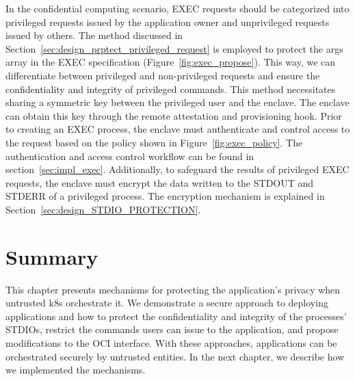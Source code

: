 In the confidential computing scenario, EXEC requests should be categorized into privileged requests issued by the application owner and unprivileged requests issued by others. The method discussed in Section~\ref{sec:design_prptect_privileged_request} is employed to protect the args array in the EXEC specification (Figure~\ref{fig:exec_propose}). This way, 
we can differentiate between privileged and non-privileged requests and ensure the confidentiality and integrity of privileged commands. This method necessitates sharing a symmetric key between the privileged user and the enclave. The enclave can obtain this key through the remote attestation and provisioning hook. Prior to creating an EXEC process,
the enclave must authenticate and control access to the request based on the policy shown in Figure~\ref{fig:exec_policy}. The authentication and access control workflow can be found in section~\ref{sec:impl_exec}. Additionally, to safeguard the results of privileged EXEC requests, the enclave must encrypt the data written to the STDOUT and STDERR of a 
privileged process. The encryption mechanism is explained in Section~\ref{sec:design_STDIO_PROTECTION}.


  

\section{Summary}
This chapter presents mechanisms for protecting the application's privacy when untrusted k8s orchestrate it. We demonstrate a secure approach to deploying applications and how to protect 
the confidentiality and integrity of the processes' STDIOs, restrict the commands users can issue to the application, and propose modifications to the OCI interface. With these approaches, applications can be orchestrated securely by untrusted entities. 
In the next chapter, we describe how we implemented the mechanisms.
\cleardoublepage

